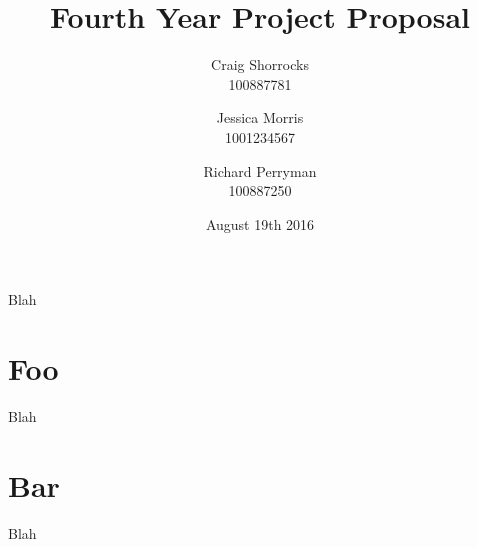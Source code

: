 \documentclass{article}
\title{Fourth Year Project Proposal}
\author{
	Craig Shorrocks \\
	100887781
	\and
	Jessica Morris \\
	1001234567
	\and
	Richard Perryman\\
	100887250
}
\date{August 19th 2016}
\begin{document}
\maketitle

Blah

\section{Foo}

Blah

\section{Bar}

Blah
\end{document}
